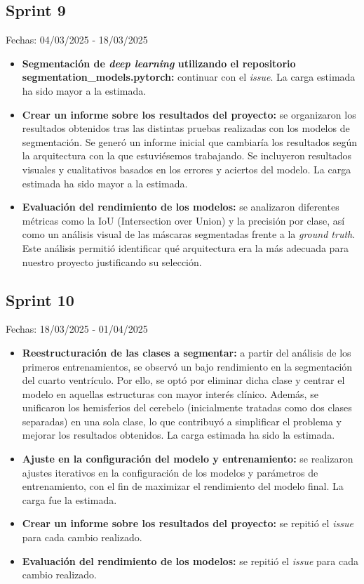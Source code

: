 \subsection{Sprint 9}
Fechas: 04/03/2025 - 18/03/2025
\begin{itemize}
    \item \textbf{Segmentación de \textit{deep learning} utilizando el repositorio segmentation\_models.pytorch:} continuar con el \textit{issue}. La carga estimada ha sido mayor a la estimada.
    \item \textbf{Crear un informe sobre los resultados del proyecto:} se organizaron los resultados obtenidos tras las distintas pruebas realizadas con los modelos de segmentación. Se generó un informe inicial que cambiaría los resultados según la arquitectura con la que estuviésemos trabajando. Se incluyeron resultados visuales y cualitativos basados en los errores y aciertos del modelo. La carga estimada ha sido mayor a la estimada.
    \item \textbf{Evaluación del rendimiento de los modelos:} se analizaron diferentes métricas como la IoU (Intersection over Union) y la precisión por clase, así como un análisis visual de las máscaras segmentadas frente a la \textit{ground truth}. Este análisis permitió identificar qué arquitectura era la más adecuada para nuestro proyecto justificando su selección.
\end{itemize}

\subsection{Sprint 10}
Fechas: 18/03/2025 - 01/04/2025
\begin{itemize}
    \item \textbf{Reestructuración de las clases a segmentar:} a partir del análisis de los primeros entrenamientos, se observó un bajo rendimiento en la segmentación del cuarto ventrículo. Por ello, se optó por eliminar dicha clase y centrar el modelo en aquellas estructuras con mayor interés clínico. Además, se unificaron los hemisferios del cerebelo (inicialmente tratadas como dos clases separadas) en una sola clase, lo que contribuyó a simplificar el problema y mejorar los resultados obtenidos. La carga estimada ha sido la estimada.
    \item \textbf{Ajuste en la configuración del modelo y entrenamiento:} se realizaron ajustes iterativos en la configuración de los modelos y parámetros de entrenamiento, con el fin de maximizar el rendimiento del modelo final. La carga fue la estimada.
    \item \textbf{Crear un informe sobre los resultados del proyecto:} se repitió el \textit{issue} para cada cambio realizado.
    \item \textbf{Evaluación del rendimiento de los modelos:} se repitió el \textit{issue} para cada cambio realizado.
\end{itemize}

